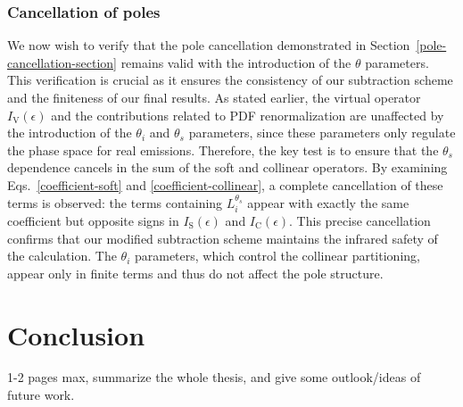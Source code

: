 \documentclass[a4paper, 12pt]{book}
\begin{document}
\subsection{Cancellation of poles}
We now wish to verify that the pole cancellation demonstrated in Section~\ref{pole-cancellation-section} remains valid with the introduction of the $\theta$ parameters. This verification is crucial as it ensures the consistency of our subtraction scheme and the finiteness of our final results. As stated earlier, the virtual operator $I_{\mathrm{V}}(\epsilon)$ and the contributions related to PDF renormalization are unaffected by the introduction of the $\theta_i$ and $\theta_s$ parameters, since these parameters only regulate the phase space for real emissions. Therefore, the key test is to ensure that the $\theta_s$ dependence cancels in the sum of the soft and collinear operators. By examining Eqs.~\ref{coefficient-soft} and \ref{coefficient-collinear}, a complete cancellation of these terms is observed: the terms containing $L_i^{\theta_s}$ appear with exactly the same coefficient but opposite signs in $I_{\mathrm{S}}(\epsilon)$ and $I_{\mathrm{C}}(\epsilon)$. This precise cancellation confirms that our modified subtraction scheme maintains the infrared safety of the calculation. The $\theta_i$ parameters, which control the collinear partitioning, appear only in finite terms and thus do not affect the pole structure.



\clearpage

\chapter{Conclusion}
1-2 pages max, summarize the whole thesis, and give some outlook/ideas of future work.

\clearpage
\end{document}
